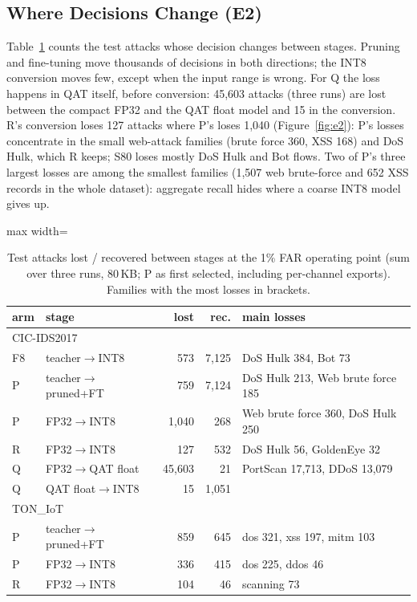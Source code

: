 \documentclass[sigplan,10pt,review,anonymous,nonacm]{acmart}
\newcommand{\cic}{CIC-IDS2017\xspace}
\newcommand{\ton}{TON\_IoT\xspace}
\begin{document}
\subsection{Where Decisions Change (E2)}\label{sec:e2}
Table~\ref{tab:e2} counts the test attacks whose decision changes between stages. Pruning and
fine-tuning move thousands of decisions in both directions; the INT8 conversion moves few, except
when the input range is wrong. For Q the loss happens in QAT itself, before conversion: 45,603 attacks
(three runs) are lost between the compact FP32 and the QAT float model and 15 in the conversion. R's
conversion loses 127 attacks where P's loses 1,040 (Figure~\ref{fig:e2}): P's losses concentrate in
the small web-attack families (brute force 360, XSS 168) and DoS Hulk, which R keeps; S80 loses mostly
DoS Hulk and Bot flows. Two of P's three largest losses are among the smallest families (1,507 web
brute-force and 652 XSS records in the whole dataset): aggregate recall hides where a coarse INT8 model
gives up.

\begin{table}[t]
\caption{Test attacks lost / recovered between stages at the 1\% FAR operating point (sum over three
runs, 80\,KB; P as first selected, including per-channel exports). Families with the most losses in brackets.}
\label{tab:e2}
\small\setlength{\tabcolsep}{2pt}
\begin{adjustbox}{max width=\columnwidth}
\begin{tabular}{llrrl}
\toprule
arm & stage & lost & rec. & main losses \\
\midrule
\multicolumn{5}{l}{\cic} \\
F8 & teacher$\rightarrow$INT8 & 573 & 7,125 & DoS Hulk 384, Bot 73 \\
P & teacher$\rightarrow$pruned+FT & 759 & 7,124 & DoS Hulk 213, Web brute force 185 \\
P & FP32$\rightarrow$INT8 & 1,040 & 268 & Web brute force 360, DoS Hulk 250 \\
R & FP32$\rightarrow$INT8 & 127 & 532 & DoS Hulk 56, GoldenEye 32 \\
Q & FP32$\rightarrow$QAT float & 45,603 & 21 & PortScan 17,713, DDoS 13,079 \\
Q & QAT float$\rightarrow$INT8 & 15 & 1,051 & \\
\midrule
\multicolumn{5}{l}{\ton} \\
P & teacher$\rightarrow$pruned+FT & 859 & 645 & dos 321, xss 197, mitm 103 \\
P & FP32$\rightarrow$INT8 & 336 & 415 & dos 225, ddos 46 \\
R & FP32$\rightarrow$INT8 & 104 & 46 & scanning 73 \\
\bottomrule
\end{tabular}
\end{adjustbox}
\end{table}
\end{document}
